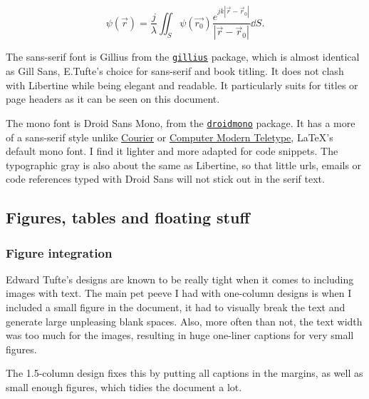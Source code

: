 \documentclass[
	a4paper,
	raggedright,
	twoside,
	12pt,
	colorful,
]{tufte-style-article}
\begin{document}
\begin{equation}
\psi(\vec r) = \frac{j}{\lambda} \iint_S \psi(\vec{r_0})\frac{e^{jk|\vec r - \vec r_0|}}{|\vec r - \vec r_0|}\dd S.
\end{equation}

\begingroup\sffamily
The sans-serif font is Gillius from the \href{www.ctan.org/pkg/gillius}{\texttt{gillius}} package, which is almost identical as Gill Sans, E.Tufte's choice for sans-serif and book titling. It does not clash with Libertine while being elegant and readable. It particularly suits for titles or page headers as it can be seen on this document.
\endgroup

\begingroup\ttfamily
The mono font is Droid Sans Mono, from the \href{www.ctan.org/pkg/droid}{\texttt{droidmono}} package. It has a more of a sans-serif style unlike \href{www.ctan.org/tex-archive/fonts/psfonts/psnfss-source/courier}{Courier} or \href{www.ctan.org/tex-archive/fonts/cm/}{Computer Modern Teletype}, \LaTeX{}'s default mono font. I find it lighter and more adapted for code snippets. The typographic gray is also about the same as Libertine, so that little urls, emails or code references typed with Droid Sans will not stick out in the serif text.
\endgroup


\subsection{Figures, tables and floating stuff}

\subsubsection{Figure integration}

Edward Tufte's designs are known to be really tight when it comes to including images with text. The main pet peeve I had with one-column designs is when I included a small figure in the document, it had to visually break the text and generate large unpleasing blank spaces. Also, more often than not, the text width was too much for the images, resulting in huge one-liner captions for very small figures.

The 1.5-column design fixes this by putting all captions in the margins, as well as small enough figures, which tidies the document a lot.
\end{document}
